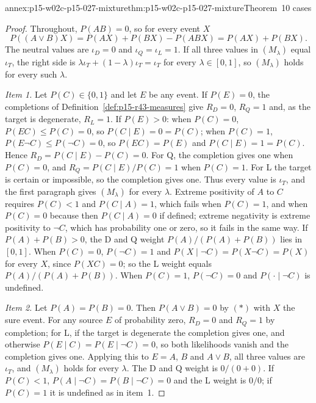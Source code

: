 \begin{annexitem}{annex:p15-w02c-p15-027-mixture}{thm:p15-w02c-p15-027-mixture}{Theorem~10 cases}
\begin{proof}
Throughout, \(P(AB)=0\), so for every event \(X\)
\[
 P((A\vee B)X)=P(AX)+P(BX)-P(ABX)=P(AX)+P(BX).
 \tag{\(\ast\)}
\]
The neutral values are \(\iota_D=0\) and \(\iota_Q=\iota_L=1\). If all
three values in \((M_\lambda)\) equal \(\iota_T\), the right side is
\(\lambda\iota_T+(1-\lambda)\iota_T=\iota_T\) for every
\(\lambda\in[0,1]\), so \((M_\lambda)\) holds for every such \(\lambda\).

\emph{Item 1.} Let \(P(C)\in\{0,1\}\) and let \(E\) be any event. If
\(P(E)=0\), the completions of Definition~\ref{def:p15-r43-measures}
give \(R_D=0\), \(R_Q=1\) and, as the target is degenerate, \(R_L=1\).
If \(P(E)>0\): when \(P(C)=0\), \(P(EC)\leq P(C)=0\), so
\(P(C\mid E)=0=P(C)\); when \(P(C)=1\), \(P(E\neg C)\leq P(\neg C)=0\), so
\(P(EC)=P(E)\) and \(P(C\mid E)=1=P(C)\). Hence \(R_D=P(C\mid E)-P(C)=0\).
For Q, the completion gives one when \(P(C)=0\), and
\(R_Q=P(C\mid E)/P(C)=1\) when \(P(C)=1\). For L the target is certain or
impossible, so the completion gives one. Thus every value is
\(\iota_T\), and the first paragraph gives \((M_\lambda)\) for every
\(\lambda\). Extreme positivity of \(A\) to \(C\) requires \(P(C)<1\) and
\(P(C\mid A)=1\), which fails when \(P(C)=1\), and when \(P(C)=0\)
because then \(P(C\mid A)=0\) if defined; extreme negativity is extreme
positivity to \(\neg C\), which has probability one or zero, so it fails
in the same way. If \(P(A)+P(B)>0\), the D and Q weight
\(P(A)/(P(A)+P(B))\) lies in \([0,1]\). When \(P(C)=0\),
\(P(\neg C)=1\) and \(P(X\mid\neg C)=P(X\neg C)=P(X)\) for every \(X\),
since \(P(XC)=0\); so the L weight equals \(P(A)/(P(A)+P(B))\). When
\(P(C)=1\), \(P(\neg C)=0\) and \(P(\cdot\mid\neg C)\) is undefined.

\emph{Item 2.} Let \(P(A)=P(B)=0\). Then \(P(A\vee B)=0\) by
\((\ast)\) with \(X\) the sure event. For any source \(E\) of probability
zero, \(R_D=0\) and \(R_Q=1\) by completion; for L, if the target is
degenerate the completion gives one, and otherwise
\(P(E\mid C)=P(E\mid\neg C)=0\), so both likelihoods vanish and the
completion gives one. Applying this to \(E=A\), \(B\) and \(A\vee B\),
all three values are \(\iota_T\), and \((M_\lambda)\) holds for every
\(\lambda\). The D and Q weight is \(0/(0+0)\). If \(P(C)<1\),
\(P(A\mid\neg C)=P(B\mid\neg C)=0\) and the L weight is \(0/0\); if
\(P(C)=1\) it is undefined as in item~1.


\end{proof}
\end{annexitem}
